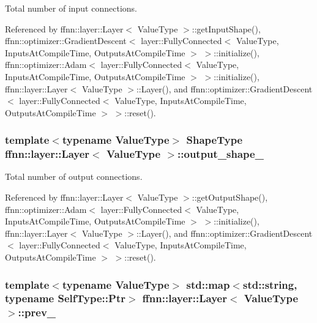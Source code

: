 Total number of input connections. 



Referenced by ffnn\-::layer\-::\-Layer$<$ Value\-Type $>$\-::get\-Input\-Shape(), ffnn\-::optimizer\-::\-Gradient\-Descent$<$ layer\-::\-Fully\-Connected$<$ Value\-Type, Inputs\-At\-Compile\-Time, Outputs\-At\-Compile\-Time $>$ $>$\-::initialize(), ffnn\-::optimizer\-::\-Adam$<$ layer\-::\-Fully\-Connected$<$ Value\-Type, Inputs\-At\-Compile\-Time, Outputs\-At\-Compile\-Time $>$ $>$\-::initialize(), ffnn\-::layer\-::\-Layer$<$ Value\-Type $>$\-::\-Layer(), and ffnn\-::optimizer\-::\-Gradient\-Descent$<$ layer\-::\-Fully\-Connected$<$ Value\-Type, Inputs\-At\-Compile\-Time, Outputs\-At\-Compile\-Time $>$ $>$\-::reset().

\hypertarget{classffnn_1_1layer_1_1_layer_a453330bda96277cd7b794bfab4804c47}{
\subsubsection[{output\-\_\-shape\-\_\-}]{\setlength{\rightskip}{0pt plus 5cm}template$<$typename Value\-Type$>$ {\bf Shape\-Type} {\bf ffnn\-::layer\-::\-Layer}$<$ Value\-Type $>$\-::output\-\_\-shape\-\_\-\hspace{0.3cm}{\ttfamily [protected]}}}\label{classffnn_1_1layer_1_1_layer_a453330bda96277cd7b794bfab4804c47}


Total number of output connections. 



Referenced by ffnn\-::layer\-::\-Layer$<$ Value\-Type $>$\-::get\-Output\-Shape(), ffnn\-::optimizer\-::\-Adam$<$ layer\-::\-Fully\-Connected$<$ Value\-Type, Inputs\-At\-Compile\-Time, Outputs\-At\-Compile\-Time $>$ $>$\-::initialize(), ffnn\-::layer\-::\-Layer$<$ Value\-Type $>$\-::\-Layer(), and ffnn\-::optimizer\-::\-Gradient\-Descent$<$ layer\-::\-Fully\-Connected$<$ Value\-Type, Inputs\-At\-Compile\-Time, Outputs\-At\-Compile\-Time $>$ $>$\-::reset().

\hypertarget{classffnn_1_1layer_1_1_layer_ad9e644d000ce8595192153c6c49927b6}{
\subsubsection[{prev\-\_\-}]{\setlength{\rightskip}{0pt plus 5cm}template$<$typename Value\-Type$>$ std\-::map$<$std\-::string, typename {\bf Self\-Type\-::\-Ptr}$>$ {\bf ffnn\-::layer\-::\-Layer}$<$ Value\-Type $>$\-::prev\-\_\-\hspace{0.3cm}{\ttfamily [protected]}}}\label{classffnn_1_1layer_1_1_layer_ad9e644d000ce8595192153c6c49927b6}


